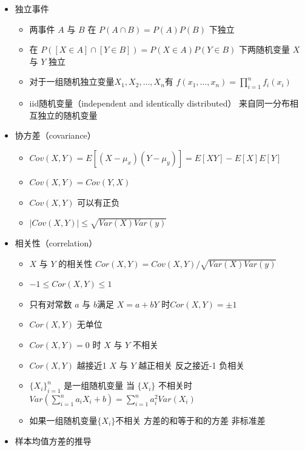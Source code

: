 \documentclass[]{book}
\providecommand{\tightlist}{%
  \setlength{\itemsep}{0pt}\setlength{\parskip}{0pt}}
\begin{document}
\begin{itemize}
\item
  独立事件

  \begin{itemize}
  \tightlist
  \item
    两事件 \(A\) 与 \(B\) 在 \(P(A \cap B) = P(A)P(B)\) 下独立
  \item
    在 \(P([X \in A] \cap [Y \in B]) = P(X\in A)P(Y\in B)\) 下两随机变量 \(X\) 与 \(Y\) 独立
  \item
    对于一组随机独立变量\(X_1, X_2, \ldots, X_n\)有 \(f(x_1,\ldots, x_n) = \prod_{i=1}^n f_i(x_i)\)
  \item
    iid随机变量（independent and identically distributed） 来自同一分布相互独立的随机变量
  \end{itemize}
\item
  协方差（covariance）

  \begin{itemize}
  \tightlist
  \item
    \(Cov(X, Y) = E[(X - \mu_x)(Y - \mu_y)] = E[X Y] - E[X]E[Y]\)
  \item
    \(Cov(X, Y) = Cov(Y, X)\)
  \item
    \(Cov(X, Y)\) 可以有正负
  \item
    \(|Cov(X, Y)| \leq \sqrt{Var(X) Var(y)}\)
  \end{itemize}
\item
  相关性（correlation）

  \begin{itemize}
  \tightlist
  \item
    \(X\) 与 \(Y\) 的相关性 \(Cor(X, Y) = Cov(X, Y) / \sqrt{Var(X) Var(y)}\)
  \item
    \(-1 \leq Cor(X, Y) \leq 1\)
  \item
    只有对常数 \(a\) 与 \(b\)满足 \(X = a + bY\) 时\(Cor(X, Y) = \pm 1\)
  \item
    \(Cor(X, Y)\) 无单位
  \item
    \(Cor(X, Y) = 0\) 时 \(X\) 与 \(Y\) 不相关
  \item
    \(Cor(X,Y)\) 越接近1 \(X\) 与 \(Y\) 越正相关 反之接近-1 负相关
  \item
    \(\{X_i\}_{i=1}^n\) 是一组随机变量 当 \(\{X_i\}\) 不相关时 \(Var\left(\sum_{i=1}^n a_i X_i + b\right) = \sum_{i=1}^n a_i^2 Var(X_i)\)
  \item
    如果一组随机变量\(\{X_i\}\)不相关 方差的和等于和的方差 非标准差
  \end{itemize}
\item
  样本均值方差的推导


\end{itemize}
\end{document}
